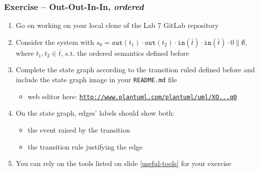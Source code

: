 \documentclass[presentation]{beamer}\mode<presentation>{\usetheme{AMSCesenaPurpleAndGold}}
\newcommand{\labN}{7}
\begin{document}
\begin{frame}[allowframebreaks]
\frametitle{Exercise \currentExercise{} -- Out-Out-In-In, \emph{ordered}}
    \begin{enumerate}
        \item Go on working on your local clone of the Lab \labN{} GitLab repository
        
        \vfill
        
        \item Consider the system with \alert{$s_0 = \mathtt{out}(t_1) \cdot \mathtt{out}(t_2) \cdot \mathtt{in}(\bar t) \cdot \mathtt{in}(\bar t) \cdot 0  \parallel \emptyset$}, where $t_1, t_2 \in \bar{t}$, s.t. the \alert{ordered} \linda{} semantics defined before
        
        \vfill
    
        \item Complete the state graph according to the transition ruled defined before and include the state graph image in your \alert{\texttt{README.md}} file
        \begin{itemize}
            \item web editor here: \href{
                http://www.plantuml.com/plantuml/uml/XO_1IiD048RlynHpR8MMjCTIacBLenvgJxM79JlMePlTi3khHl5WKV15V1kVeazYQeH627XOzeV__pwOMH3b9HO6mfPjgRmgy8nkLJHouQmi-8bmdBJAXIYXdqegGyYY3EUXcxvK1U7SHS_auOur8HMbLAWfv9vBOMUXHOQ36fy1yLJbsurtqUgvCyvFf-TMizsaAJh3zzIrM5fwBEj4kbvLP8nxW1U0rSaQ1uCKGmADFYGJT55wij-zzeU_QTSVikt9rzlnJt3_yLc_TmX9OnYrm1kxkbfUrsaDZRUf_x4TK0YZHZS-xhjqO_nxqmIpB8CPMHqBymq0
            }{\texttt{http://www.plantuml.com/plantuml/uml/XO...q0}}
        \end{itemize}
        
        \vfill
        
        \item On the state graph, edges' labels should show both:
        \begin{itemize}
            \item the event raised by the transition
            \item the transition rule justifying the edge
        \end{itemize}
        
        \vfill
        
        \item You can rely on the tools listed on slide \ref{useful-tools} for your exercise
        
        \vfill
        

\end{enumerate}
\end{frame}
\end{document}
